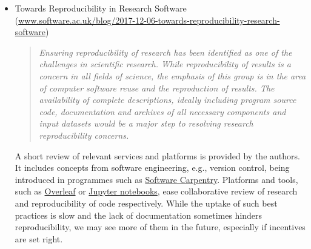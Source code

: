 \documentclass[11pt,letterpaper]{article}
\newcommand{\katznote}[1]{ {\textcolor{magenta}    { ***Dan: #1 }}}
\newcommand{\LXnote}[1]{  {\textcolor{orange}      { ***Alex: #1 }}}
\begin{document}
\begin{itemize}


\item Towards Reproducibility in Research Software\\ (\href{https://www.software.ac.uk/blog/2017-12-06-towards-reproducibility-research-software}{www.software.ac.uk/blog/2017-12-06-towards-reproducibility-research-software})
\begin{quote}\textit{
Ensuring reproducibility of research has been identified as one of the challenges in scientific research. While reproducibility of results is a concern in all fields of science, the emphasis of this group is in the area of computer software reuse and the reproduction of results. The availability of complete descriptions, ideally including program source code, documentation and archives of all necessary components and input datasets would be a major step to resolving research reproducibility concerns.}
\end{quote}
A short review of relevant services and platforms is provided by the authors. It includes concepts from software engineering, e.g., version control, being introduced in programmes such as \href{https://software-carpentry.org}{Software Carpentry}.  %
Platforms and tools, such as \href{https://www.overleaf.com}{Overleaf} or \href{http://jupyter.org}{Jupyter notebooks}, ease collaborative review of research and reproducibility of code respectively. While the uptake of such best practices is slow and the lack of documentation sometimes hinders reproducibility, we may see more of them in the future, especially if incentives are set right.


\end{itemize}
\end{document}
